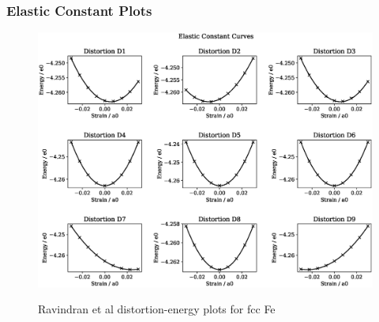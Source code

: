 \clearpage
\subsubsection{Elastic Constant Plots}

\begin{figure}[htb]
\centering
\includegraphics[width=.90\linewidth]{chapters/potentials_fe_pd_ru/feru_potential/ec_rfkj/elastic_strains_bp_1.eps}  
\label{fig:feru-fefcc-distortions}
\caption{Ravindran et al\cite{dftrfkj} distortion-energy plots for \acrshort{fcc} Fe}
\end{figure}

